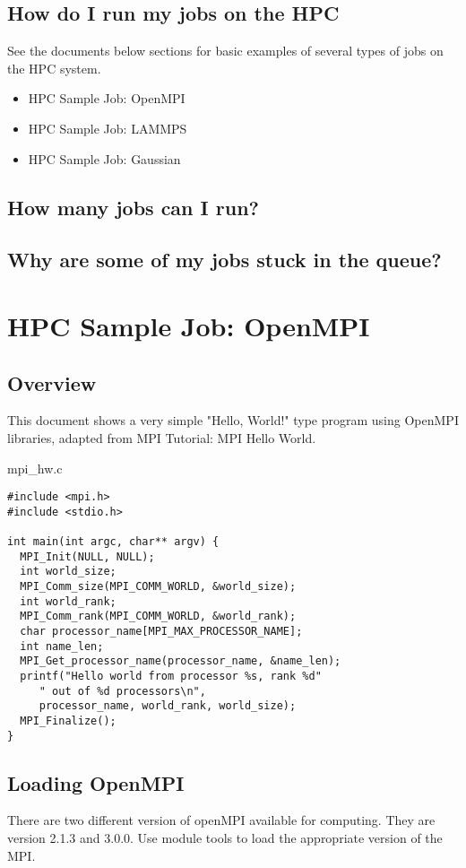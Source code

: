 \documentclass[11pt]{article}
\numberwithin{figure}{section}
\begin{document}
\subsection{How do I run my jobs on the HPC}
See the documents below sections for basic examples of several types of jobs on
the HPC system.

\begin{itemize}
    \item HPC Sample Job: OpenMPI
    \item HPC Sample Job: LAMMPS
    \item HPC Sample Job: Gaussian
\end{itemize}

\subsection{How many jobs can I run?}
\subsection{Why are some of my jobs stuck in the queue?}

\section{HPC Sample Job: OpenMPI}
\subsection{Overview}
This document shows a very simple "Hello, World!" type program using OpenMPI
libraries, adapted from MPI Tutorial: MPI Hello World.

mpi\_hw.c

\begin{lstlisting}[frame=single]
#include <mpi.h>
#include <stdio.h>
 
int main(int argc, char** argv) {
  MPI_Init(NULL, NULL);
  int world_size;
  MPI_Comm_size(MPI_COMM_WORLD, &world_size);
  int world_rank;
  MPI_Comm_rank(MPI_COMM_WORLD, &world_rank);
  char processor_name[MPI_MAX_PROCESSOR_NAME];
  int name_len;
  MPI_Get_processor_name(processor_name, &name_len);
  printf("Hello world from processor %s, rank %d"
     " out of %d processors\n",
     processor_name, world_rank, world_size);
  MPI_Finalize();
}
\end{lstlisting}

\subsection{Loading OpenMPI}
There are two different version of openMPI available for computing. They are
version 2.1.3 and 3.0.0. Use module tools to load the appropriate version of
the MPI.
\end{document}
